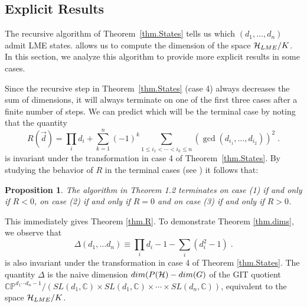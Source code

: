 \documentclass[12pt]{article}
\newtheorem{proposition}[theorem]{Proposition}
\theoremstyle{definition}
\newcommand{\be}{\begin{equation}}
\newcommand{\ee}{\end{equation}}
\begin{document}
\subsection{Explicit Results}

The recursive algorithm of Theorem~\ref{thm.States} tells us which $(d_1, \dots, d_n)$ admit LME states. allows us to
compute the dimension of the space ${\cal H}_{LME}/K$. In this section, we analyze this algorithm to provide more explicit results in some cases.

Since the recursive step in Theorem~\ref{thm.States} (case 4) always decreases the sum of dimensions, it will always terminate on one of the first three cases after a finite number of steps. We can predict which will be the terminal case by noting that
the quantity
\be
R(\vec{d}) = \prod_i d_i + \sum_{k=1}^n (-1)^k \sum_{1 \le i_1 < \cdots < i_k \le n} (\gcd(d_{i_1},\dots,d_{i_2}))^2 \; .
\ee
is invariant under the transformation in case 4 of Theorem~\ref{thm.States}. By studying the behavior of $R$ in the terminal cases (see \cite{mathpaper}) it follows that:
\begin{proposition}\label{prop:Rcases}
The algorithm in Theorem 1.2 terminates on case (1) if and only if $R<0$, on case (2) if and only if $R=0$ and on case (3) if and only if $R>0$.
\end{proposition}
This immediately gives Theorem \ref{thm.R}. To demonstrate Theorem \ref{thm.dims}, we observe that
\be
\label{defDelta}
\Delta(d_1, \dots d_n) \equiv \prod_i d_i - 1 - \sum_i (d_i^2 - 1)   \; .
\ee
is also invariant under the transformation in case 4 of Theorem \ref{thm.States}. The quantity $\Delta$ is the naive dimension $dim(P({\cal H}) - dim(G)$ of the GIT quotient $\mathbb{CP}^{d_1 \cdots d_n - 1}/(SL(d_1, \mathbb{C}) \times SL(d_1, \mathbb{C}) \times \cdots \times SL(d_n, \mathbb{C}))$, equivalent to the space ${\cal H}_{LME}/K$.
\end{document}
